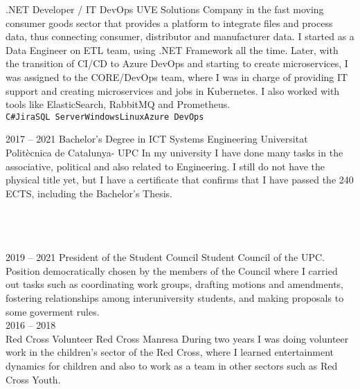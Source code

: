 \documentclass[9pt]{developercv} %
\begin{document}
\begin{entrylist}
		{.NET Developer / IT DevOps}
		{UVE Solutions}
		{Company in the fast moving consumer goods sector that provides a platform to integrate files and process data, thus connecting consumer, distributor and manufacturer data.
		I started as a Data Engineer on ETL team, using .NET Framework all the time. Later, with the transition of CI/CD to Azure DevOps and starting to create microservices, I was assigned to the CORE/DevOps team, where I was in charge of providing IT support and creating microservices and jobs in Kubernetes. I also worked with tools like ElasticSearch, RabbitMQ and Prometheus. 
		\\ \texttt{C\#}\slashsep\texttt{Jira}\slashsep\texttt{SQL Server}\slashsep\texttt{Windows}\slashsep\texttt{Linux}\slashsep\texttt{Azure DevOps}
		}

\end{entrylist}



\begin{entrylist}
	\entry
		{2017 -- 2021}
		{Bachelor's Degree in ICT Systems Engineering}
		{Universitat Politècnica de Catalunya- UPC}
		{In my university I have done many tasks in the associative, political and also related to Engineering. I still do not have the physical title yet, but I have a certificate that confirms that I have passed the 240 ECTS, including the Bachelor's Thesis.\\ 
		\\ \\ \\}
\end{entrylist}




\begin{entrylist}
	\entry
	{2019 -- 2021}
	{President of the Student Council}
	{Student Council of the UPC.}
	{Position democratically chosen by the members of the Council where I carried out tasks such as coordinating work groups, drafting motions and amendments, fostering relationships among interuniversity students, and making proposals to some goverment rules.\\
	}
	\entry
	{2016 -- 2018\\}
	{Red Cross Volunteer}
	{Red Cross Manresa}
	{During two years I was doing volunteer work in the children's sector of the Red Cross, where I learned entertainment dynamics for children and also to work as a team in other sectors such as Red Cross Youth.\\
	}
\end{entrylist}
\end{document}
